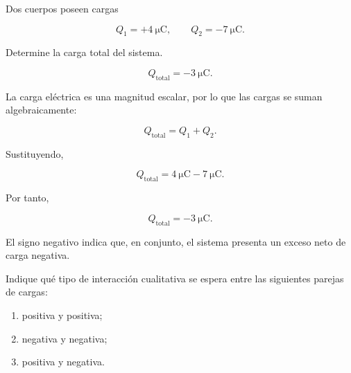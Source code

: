 
\begin{ejercicio}

Dos cuerpos poseen cargas

\[
Q_1=+\SI{4}{\micro\coulomb},
\qquad
Q_2=-\SI{7}{\micro\coulomb}.
\]

Determine la carga total del sistema.

\end{ejercicio}

\begin{respuesta}

\[
\boxed{
Q_{\text{total}}=-\SI{3}{\micro\coulomb}
}.
\]

\end{respuesta}

\begin{explicacion}

La carga eléctrica es una magnitud escalar, por lo que las cargas se suman
algebraicamente:

\[
Q_{\text{total}}=Q_1+Q_2.
\]

Sustituyendo,

\[
Q_{\text{total}}
=
\SI{4}{\micro\coulomb}
-\SI{7}{\micro\coulomb}.
\]

Por tanto,

\[
\boxed{
Q_{\text{total}}=-\SI{3}{\micro\coulomb}
}.
\]

El signo negativo indica que, en conjunto, el sistema presenta un exceso
neto de carga negativa.

\end{explicacion}



\begin{ejercicio}

Indique qué tipo de interacción cualitativa se espera entre las siguientes
parejas de cargas:

\begin{enumerate}
    \item positiva y positiva;
    \item negativa y negativa;
    \item positiva y negativa.
\end{enumerate}

\end{ejercicio}

